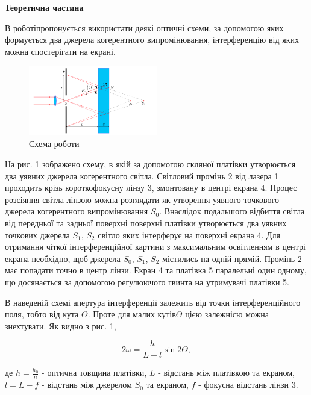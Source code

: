 \begin{center}
    \Large{\textbf{Теоретична частина}}    
\end{center}

\vspace{1mm}

В роботіпропонується використати деякі оптичні схеми, за допомогою
яких формується два джерела когерентного випромінювання, інтерференцію від
яких можна спостерігати на екрані.

\begin{figure}
    \includegraphics[width=0.5\textwidth]{assets/main_scheme.png}
    \caption{Схема роботи}
\end{figure}

На рис. 1 зображено схему, в якій за допомогою скляної 
платівки утворюється два уявних джерела когерентного світла.
Світловий промінь 2 від лазера 1 проходить крізь короткофокусну лінзу 3,
змонтовану в центрі екрана 4. Процес розсіяння світла лінзою
можна розглядати як утворення уявного точкового джерела
когерентного випромінювання $S_0$. Внаслідок подальшого відбиття
світла від передньої та задньої поверхні поверхні платівки 
утворюється два уявних точкових джерела $S_1$, $S_2$ світло
яких інтерферує на поверхні екрана 4. Для отримання чіткої інтерференційної
картини з максимальним освітленням в центрі екрана необхідно, щоб
джерела $S_0$, $S_1$, $S_2$ містились на одній прямій. Промінь 2 має попадати
точно в центр лінзи. Екран 4 та платівка 5 паралельні один
одному, що досянається за допомогою регулюючого гвинта на утримувачі платівки 5.


В наведеній схемі апертура інтерференції залежить від точки інтерференційного поля,
тобто від кута $\Theta$. Проте для малих кутів$\Theta$ цією залежнісю
можна знехтувати. Як видно з рис. 1,

\begin{equation}
    2 \omega = \frac{h}{L+l} \sin{2\Theta},
\end{equation}

де $h=\frac{h_0}{n}$ - оптична товщина платівки,
$L$  - відстань між платівкою та екраном,
$l = L - f$ - відстань між джерелом $S_0$ та екраном,
$f$ - фокусна відстань лінзи 3.

